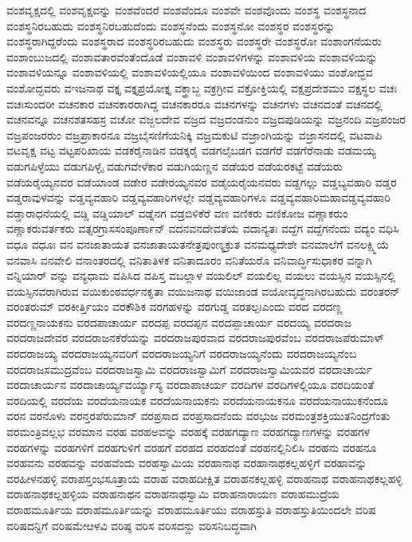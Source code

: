 {ವಂಶವೃಕ್ಷದಲ್ಲಿ
ವಂಶವೃಕ್ಷವನ್ನು
ವಂಶವೆಂದರೆ
ವಂಶವೆಂದೂ
ವಂಶವೇ
ವಂಶವೊಂದು
ವಂಶಸ್ಥ
ವಂಶಸ್ಥನಾದ
ವಂಶಸ್ಥನಿರಬಹುದು
ವಂಶಸ್ಥನಿರಬಹುದೆಂದು
ವಂಶಸ್ಥನೆಂದು
ವಂಶಸ್ಥನೋ
ವಂಶಸ್ಥರ
ವಂಶಸ್ಥರನ್ನು
ವಂಶಸ್ಥರಾಗಿದ್ದರೆಂದು
ವಂಶಸ್ಥರಾದ
ವಂಶಸ್ಥರಿರಬಹುದು
ವಂಶಸ್ಥರು
ವಂಶಸ್ಥರೇ
ವಂಶಸ್ಥರೋ
ವಂಶಾಂಗನೆಯರು
ವಂಶಾಂಬುಜದಲ್ಲಿ
ವಂಶಾವತಾರವೆಂತೆಂದೊಡೆ
ವಂಶಾವಳಿ
ವಂಶಾವಳಿಗಳನ್ನು
ವಂಶಾವಳಿಯ
ವಂಶಾವಳಿಯನ್ನು
ವಂಶಾವಳಿಯನ್ನೂ
ವಂಶಾವಳಿಯಲ್ಲಿ
ವಂಶಾವಳಿಯಲ್ಲಿಯೂ
ವಂಶಾವಳಿಯಿಂದ
ವಂಶಾವಳಿಯು
ವಂಶೋದ್ಭವ
ವಂಶೋದ್ಭವರು
ವಇಜನಾಥ
ವಕ್ತೃ
ವಕ್ತೃಪ್ರಯೋಕ್ತೃ
ವಕ್ತ್ರಾಬ್ಜ
ವಕ್ರಗ್ರೀವ
ವಕ್ರೋಕ್ತಿಯಲ್ಲಿ
ವಕ್ಷಪ್ರದೇಶಮಂ
ವಕ್ಷಸ್ಥಲ
ವಚಃ
ವಚಃಸುಂದರೀ
ವಚನಕಾರ
ವಚನಕಾರರಾಗಿದ್ದ
ವಚನಕಾರರೂ
ವಚನಗಳನ್ನು
ವಚನಗಳು
ವಚನದಂತೆ
ವಚನದಲ್ಲಿ
ವಚನವನ್ನೂ
ವಚನಶತಸಹಸ್ರ
ವಚೋ
ವಜ್ಜಲದೇವ
ವಜ್ರದ
ವಜ್ರದಂಡನುಂ
ವಜ್ರದಪುಡಿಯನ್ನು
ವಜ್ರನಂದಿ
ವಜ್ರಪಂಜರ
ವಜ್ರಪಂಜರರುಂ
ವಜ್ರಪ್ರಾಕಾರನೂ
ವಜ್ರಬೈಸಣಿಗೆಯನಿಕ್ಕಿ
ವಜ್ರಮಕುಟಿ
ವಜ್ರಾಂಗಿಯನ್ನು
ವಜ್ರಾಸನದಲ್ಲಿ
ವಟವಾಪಿ
ವಟವೃಕ್ಷ
ವಟ್ಟ
ವಟ್ಟಪರಿಖಾಯ
ವಡಕರೈನಾಡಿನ
ವಡಕ್ಕರೈ
ವಡಗಲೈಬಡಗ
ವಡಗೆರೆ
ವಡಗೆರೆನಾಡು
ವಡಮಯ್ಯ
ವಡುಗಪಿಳ್ಳೆಯು
ವಡುಗಪಿಳ್ಳೈ
ವಡುಗವೇಳೆಕಾರ
ವಡುಗಿಯಣ್ಣನ
ವಡೆಯರ
ವಡೆಯರಕಟ್ಟೆ
ವಡೆಯರು
ವಡೆಯರೈಯ್ಯನವರ
ವಡೆಯಾಂಡ
ವಡೇರ
ವಡೇರಯ್ಯನವರ
ವಡೈಯರೈಯನವರು
ವಡ್ಡಗಲ್ಲು
ವಡ್ಡಬ್ಯವಹಾರಿ
ವಡ್ಡರ
ವಡ್ಡರಾವುಳವನ್ನು
ವಡ್ಡವ್ಯವಹಾರಿ
ವಡ್ಡವ್ಯವಹಾರಿಗಳಲ್ಲೇ
ವಡ್ಡವ್ಯವಹಾರಿಗಳೂ
ವಡ್ಡವ್ಯವಹಾರಿಮಹಾವಡ್ಡವ್ಯವಹಾರಿ
ವಡ್ಡಾರಾಧನೆಯಲ್ಲಿ
ವಡ್ಡಿ
ವಡ್ಡಿಯಾಲ್
ವಡ್ನೆನಗ
ವಡ್ರಬಿಳಿಕೆರೆ
ವಣ
ವಣಿಕರು
ವಣಿಕೋಜ
ವಣ್ಣಾಕರುಂ
ವಣ್ಣಾಕರುವರ್ತಕರು
ವತ್ಸರಗ್ರಾಸಸಂಪೂರ್ಣಾನ್
ವದನವನದೇವತೆಯೆ
ವದಾನ್ಯತಃ
ವದ್ದೆಗ
ವದ್ದೆಗನೆಂದು
ವದ್ಯಂ
ವಧಿಸಿ
ವಧೂ
ವಧೂಃ
ವನ
ವನಜಾತಾಯತ
ವನಜಾತಾಯತನೇತ್ರಪುಂಣ್ಯಕ್ರುತ
ವನಮಧ್ಯದೇಶೇ
ವನಮಾಲೆಗೆ
ವನಲಕ್ಷ್ಮಿಯೆ
ವನವಾಸಿ
ವನವೇಲಿ
ವನಾಂತರದಲ್ಲಿ
ವನಿತಾತಿಳಕ
ವನಿತಾದೂರಂ
ವನಿತೆಯರೊ
ವನಿವಾರ್ದ್ಧಿಸುಧಾಕರ
ವನ್ನಾಗಿ
ವನ್ನಿಯಾರ್
ವನ್ನು
ವನ್ಯಧಾಮ
ವಪಿಸಿದ
ವಪಿಸ್ತ
ವಬಲ್ಲಾಳ
ವಯಲಿಲ್
ವಯಲಿಲ್ಲ
ವಯಲು
ವಯಸ್ಸಿನ
ವಯಸ್ಸಿನಲ್ಲಿ
ವಯಸ್ಸಿನವರಾಗಿರುವ
ವಯಿಕುಂಠವರ್ಧನಕೃತಾ
ವಯಿಜನಾಥ
ವಯಿಜಾಂಡ
ವಯೋವೃದ್ಧನಾಗಿರಬಹುದು
ವರಂತರನ್
ವರಂತರುಮ್
ವರಕೀರ್ತ್ತಿಯಂ
ವರಕೌಶಿಕ
ವರಗಹಳನ್ನು
ವರಗುಡ್ಡ
ವರತಲ್ಪಃಎಂದು
ವರದ
ವರದಣ್ಣ
ವರದಣ್ಣನಾಯಕನು
ವರದಪಾಚಾರ್ಯ
ವರದಪ್ಪ
ವರದಪ್ಪನ
ವರದಪ್ಪಾಚಾರ್ಯ
ವರದಯ್ಯ
ವರದರಾಜ
ವರದರಾಜದೇವರ
ವರದರಾಜನಕೆರೆಯನ್ನು
ವರದರಾಜಪುರವಾದ
ವರದರಾಜಪುರವೆಂಬ
ವರದರಾಜಪೆರುಮಾಳ್
ವರದರಾಜಯ್ಯ
ವರದರಾಜಯ್ಯನವರಿಗೆ
ವರದರಾಜಯ್ಯನಿಗೆ
ವರದರಾಜಯ್ಯನೆಂದು
ವರದರಾಜಯ್ಯನೆಂಬ
ವರದರಾಜಸಮುದ್ರವೆಂಬ
ವರದರಾಜಸ್ವಾಮಿ
ವರದರಾಜಸ್ವಾಮಿಗೆ
ವರದರಾಜಸ್ವಾಮಿಯವರ
ವರದಾಚಾರ್ಯ
ವರದಾಚಾರ್ಯನ
ವರದಾಚಾರ್ಯ್ಯವರ್ಯ್ಯಾಸ್ಯ
ವರದಾಪಾಚರ್ಯ
ವರದಿಗಳ
ವರದಿಗಳಲ್ಲಿಯೂ
ವರದಿಯಂತೆ
ವರದಿಯಲ್ಲಿ
ವರದೆಯ
ವರದೆಯನಾಯಕ
ವರದೆಯನಾಯಕನು
ವರದೆಯನಾಯಕನೂ
ವರದೆಯನಾಯುಕನೆಂದೂ
ವರನ
ವರನೊಳು
ವರನ್ತರಪೆರುಮಾನ್
ವರಪ್ರಸಾದ
ವರಪ್ರಸಾದನೆಂದು
ವರಭುಜ
ವರಮಂತ್ರಶಕ್ತಿಯುತನಿಂದ್ರಗೆಂತು
ವರಮಂತ್ರಿವಲ್ಲಭ
ವರಮಾನ
ವರಹ
ವರಹಅವನ್ನು
ವರಹಕ್ಕೆ
ವರಹಗದ್ಯಾಣ
ವರಹಗದ್ಯಾಣಗಳನ್ನು
ವರಹಗಳ
ವರಹಗಳನ್ನು
ವರಹಗಳಿಗೆ
ವರಹಗುಳಿಗೆ
ವರಹಗೆ
ವರಹದ
ವರಹದಂತೆ
ವರಹನಲ್ಲಿನಿಲಿಸಿ
ವರಹನು
ವರಹನೂ
ವರಹವನು
ವರಹವನ್ನು
ವರಹವೆಂದು
ವರಹಸ್ವಾಮಿಯ
ವರಹಾನಾಥ
ವರಹಾನಾಥಕಲ್ಲಹಳ್ಳಿಗೆ
ವರಹಾವನ್ನು
ವರಹೀಳನಹಳ್ಳಿ
ವರಾಪಸ್ತಂಭಸೂತ್ರಾಯ
ವರಾಹ
ವರಾಹದೀಕ್ಷಿತ
ವರಾಹನಕಲ್ಲಹಳ್ಳಿ
ವರಾಹನಾಥ
ವರಾಹನಾಥಕಲ್ಲಹಳ್ಳಿ
ವರಾಹನಾಥಕಲ್ಲಹಳ್ಳಿಯ
ವರಾಹನಾಥನ
ವರಾಹನಾಥಸ್ವಾಮಿ
ವರಾಹನಾರಾಯಣ
ವರಾಹಮುದ್ರೆಯ
ವರಾಹಮೂರ್ತಿಯ
ವರಾಹಮೂರ್ತಿಯನ್ನು
ವರಾಹಮೂರ್ತಿಯು
ವರಾಹಸ್ತುತಿ
ವರಾಹಸ್ತುತಿಯಿಂದಲೇ
ವರಿಷ
ವರಿಷದನ್ದಿಗೆ
ವರಿಷಮೇೞಳವಿ
ವರಿಷ್ಠ
ವರಿಸ
ವರಿಸದನ್ದು
ವರಿಸನಿಬದ್ಧವಾಗಿ
}
